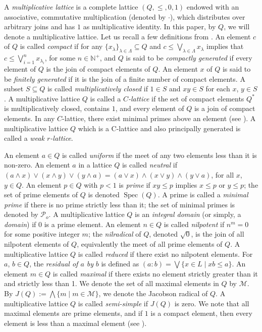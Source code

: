 \documentclass[11pt,english]{amsart}
\theoremstyle{definition}
\numberwithin{equation}{section}
\theoremstyle{remark}
\def\leq{\leqslant}
\begin{document}
	
	
	A \emph{multiplicative lattice}  is a complete lattice $(Q, \leqslant, 0, 1)$ endowed with an associative,
	commutative multiplication (denoted by $\cdot$), which distributes over arbitrary joins and has $1$ as multiplicative
	identity.
	In this paper, by $Q$, we will denote a multiplicative lattice. Let us recall a few  definitions from \cite{And-ML-1974,Dil62, And-ACIT-1976}.  An element $c$ of $Q$ is called \emph{compact} if for any $\{x_{\lambda}\}_{\lambda \in \Lambda}\subseteq Q$ and $c\leqslant \bigvee_{\lambda \in \Lambda} x_{\lambda}$ implies that $c\leqslant \bigvee_{i=1}^n x_{\lambda_i}$, for some $n\in \mathds{N}^+$, and  $Q$ is said to be \emph{compactly generated} if every element of
	$Q$ is the join of compact elements of $Q$. An element  $x$ of $Q$ is said to be \emph{finitely generated} if it is the join of a finite number of compact elements. A subset $S \subseteq Q$ is called \emph{multiplicatively closed}  if $1\in S$ and
	$xy \in S$ for each $x$, $y \in S$.  A multiplicative lattice $Q$ is called a \emph{$C$-lattice} if the set of compact elements $Q^{*}$ is multiplicatively closed, contains $1$, and every element of $Q$ is a join of compact elements. In any $C$-lattice, there exist minimal primes above an element (see \cite[p.~2]{Abs-CIT}). A multiplicative lattice $Q$ which is a C-lattice and also principally generated is called a \emph{weak $r$-lattice}.
	
	An element $a\in Q$ is called \emph{uniform} if the meet of any two elements less than it is non-zero. An element $a$ in a lattice $Q$ is called \emph{neutral} if $(a\wedge x)\vee (x\wedge y)\vee (y\wedge a) = (a\vee x)\wedge (x\vee y)\wedge (y\vee a)$, for all $x$, $y\in Q$. An element $p \in Q$ with $p < 1$ is \emph{prime} if $xy \leq p$ implies $x \leq p$ or $y \leq p$; the set of prime elements of $Q$ is denoted $\operatorname{Spec}(Q)$.  A prime is called a \emph{minimal prime} if there is no prime strictly less than it; the set of minimal primes is denoted by $\mathcal{P}_o$. A multiplicative lattice $Q$ is an \emph{integral domain} (or simply, a \emph{domain}) if $0$ is a prime element. An element $n \in Q$ is called \emph{nilpotent} if $n^{m} = 0$ for some positive integer $m$; the \emph{nilradical} of $Q$, denoted $\sqrt{0}$, is the join of all nilpotent elements of $Q$, equivalently the meet of all prime elements of $Q$. A multiplicative lattice $Q$ is called \emph{reduced} if there exist no nilpotent elements.  For $a$, $b \in Q$, the \emph{residual of $a$ by} $b$ is defined as $(a : b) = \bigvee \{ x \in L \mid x b \leq a \}$. An element $m\in Q$ is called \emph{maximal} if there exists no element strictly greater than it and strictly less than 1. We denote the set of all maximal elements in $Q$ by $\mathcal{M}$. By $J(Q):=\bigwedge \{ m\mid m\in \mathcal{M}\}$, we denote the Jacobson radical of $Q$. A multiplicative lattice $Q$ is called \emph{semi-simple} if  $J(Q)$ is zero. We note that all maximal elements are prime elements, and if $1$ is a compact element, then every element is less than a maximal element (see \cite[Lemma~2.3(1)]{Z-Lat}). 
    
\end{document}
